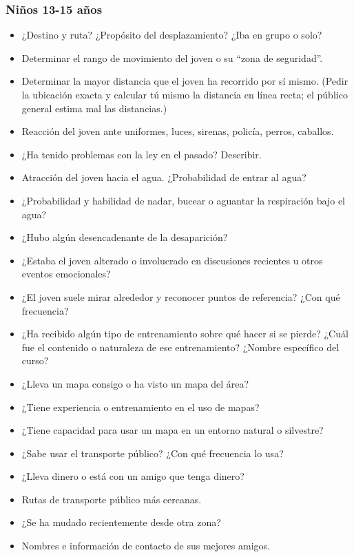 \subsubsection{Niños 13-15 años}
\begin{itemize}
    \item ¿Destino y ruta? ¿Propósito del desplazamiento? ¿Iba en grupo o solo?
    \item Determinar el rango de movimiento del joven o su “zona de seguridad”.
    \item Determinar la mayor distancia que el joven ha recorrido por sí mismo. (Pedir la ubicación exacta y calcular tú mismo la distancia en línea recta; el público general estima mal las distancias.)
    \item Reacción del joven ante uniformes, luces, sirenas, policía, perros, caballos.
    \item ¿Ha tenido problemas con la ley en el pasado? Describir.
    \item Atracción del joven hacia el agua. ¿Probabilidad de entrar al agua?
    \item ¿Probabilidad y habilidad de nadar, bucear o aguantar la respiración bajo el agua?
    \item ¿Hubo algún desencadenante de la desaparición?
    \item ¿Estaba el joven alterado o involucrado en discusiones recientes u otros eventos emocionales?
    \item ¿El joven suele mirar alrededor y reconocer puntos de referencia? ¿Con qué frecuencia?
    \item ¿Ha recibido algún tipo de entrenamiento sobre qué hacer si se pierde? ¿Cuál fue el contenido o naturaleza de ese entrenamiento? ¿Nombre específico del curso?
    \item ¿Lleva un mapa consigo o ha visto un mapa del área?
    \item ¿Tiene experiencia o entrenamiento en el uso de mapas?
    \item ¿Tiene capacidad para usar un mapa en un entorno natural o silvestre?
    \item ¿Sabe usar el transporte público? ¿Con qué frecuencia lo usa?
    \item ¿Lleva dinero o está con un amigo que tenga dinero?
    \item Rutas de transporte público más cercanas.
    \item ¿Se ha mudado recientemente desde otra zona?
    \item Nombres e información de contacto de sus mejores amigos.
\end{itemize}


